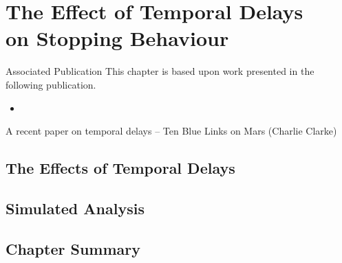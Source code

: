 
\chapter[The Effect of Temporal Delays on Stopping Behaviour]{The Effect of Temporal Delays\\on Stopping Behaviour}\label{chap:temporal}

\begin{publications_box}{Associated Publication}
This chapter is based upon work presented in the following publication.
\vspace*{-3mm}
\begin{itemize}
    \item{}
\end{itemize}
\end{publications_box}

A recent paper on temporal delays -- Ten Blue Links on Mars (Charlie Clarke)

\section{The Effects of Temporal Delays}

\section{Simulated Analysis}

\section{Chapter Summary}